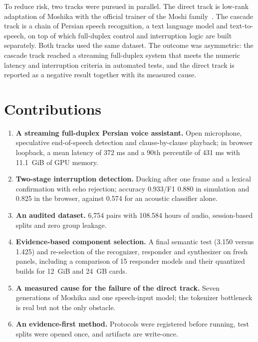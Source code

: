 To reduce risk, two tracks were pursued in parallel. The direct track is
low-rank adaptation of Moshika with the official trainer of the Moshi
family~\cite{moshifinetune2024}. The cascade track is a chain of Persian speech
recognition, a text language model and text-to-speech, on top of which
full-duplex control and interruption logic are built separately. Both tracks
used the same dataset. The outcome was asymmetric: the cascade track reached a
streaming full-duplex system that meets the numeric latency and interruption
criteria in automated tests, and the direct track is reported as a negative
result together with its measured cause.

\section{Contributions}
\label{sec:contributions}

\begin{enumerate}
\item \textbf{A streaming full-duplex Persian voice assistant.} Open
      microphone, speculative end-of-speech detection and clause-by-clause
      playback; in browser loopback, a mean latency of 372 ms and a 90th
      percentile of 431 ms with 11.1~GiB of GPU memory.

\item \textbf{Two-stage interruption detection.} Ducking after one frame and a
      lexical confirmation with echo rejection; accuracy 0.933/F1 0.880 in
      simulation and 0.825 in the browser, against 0.574 for an acoustic
      classifier alone.

\item \textbf{An audited dataset.} 6,754 pairs with 108.584 hours of audio,
      session-based splits and zero group leakage.

\item \textbf{Evidence-based component selection.} A final semantic test
      (3.150 versus 1.425) and re-selection of the recognizer, responder and
      synthesizer on fresh panels, including a comparison of 15 responder models and
      their quantized builds for 12~GiB and 24~GB cards.

\item \textbf{A measured cause for the failure of the direct track.} Seven
      generations of Moshika and one speech-input model; the tokenizer
      bottleneck is real but not the only obstacle.

\item \textbf{An evidence-first method.} Protocols were registered before
      running, test splits were opened once, and artifacts are write-once.
\end{enumerate}


